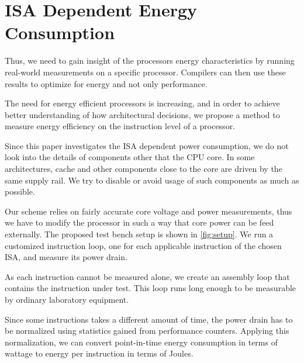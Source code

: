 \section{ISA Dependent Energy Consumption}



Thus, we need to gain insight of the processors energy characteristics by
running real-world measurements on a specific processor. Compilers can then use
these results to optimize for energy and not only performance.





The need for energy efficient processors is increasing, and in order to achieve
better understanding of how architectural decisions, we propose a method to
measure energy efficiency on the instruction level of a processor.

Since this paper investigates the ISA dependent power consumption, we do not
look into the details of components other that the CPU core. In some
architectures, cache and other components close to the core are driven by the
same supply rail\cite{rusu200765}. We try to disable or avoid usage of such
components as much as possible.

















Our scheme relies on fairly accurate core voltage and power measurements, thus
we have to modify the processor in such a way that core power can be feed
externally. The proposed test bench setup is shown in \autoref{fig:setup}. We
run a customized instruction loop, one for each applicable instruction of the
chosen ISA, and measure its power drain.

As each instruction cannot be measured alone, we create an assembly loop that
contains the instruction under test. This loop runs long enough to be measurable
by ordinary laboratory equipment.

Since some instructions takes a different amount of time, the power drain has to be
normalized using statistics gained from performance counters. Applying this
normalization, we can convert point-in-time energy consumption in terms of
wattage to energy per instruction in terms of Joules.

